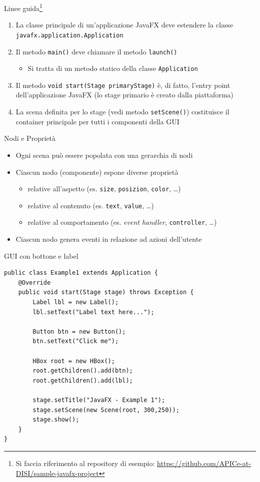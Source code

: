 \documentclass[xcolor=dvipsnames,presentation]{beamer}
\begin{document}
\begin{frame}{Linee guida\footnote{Si faccia riferimento al repository di esempio: 
\url{https://github.com/APICe-at-DISI/sample-javafx-project}
}}

\begin{enumerate}\itemsep15pt

\item La classe principale di un'applicazione JavaFX deve estendere la classe \texttt{javafx.application.Application}
\item Il metodo \texttt{main()} deve chiamare il metodo \texttt{launch()}
\begin{itemize}
\item Si tratta di un metodo statico della classe \texttt{Application}
\end{itemize}
\item Il metodo \texttt{void start(Stage primaryStage)} è, di fatto, l'entry point dell'applicazione JavaFX (lo stage primario è creato dalla piattaforma)
\item La scena definita per lo stage (vedi metodo \texttt{setScene()}) costituisce il container principale per tutti i componenti della GUI
\end{enumerate}
\end{frame}

\begin{frame}{Nodi e Proprietà}
\begin{itemize}\itemsep10pt
\item Ogni scena può essere popolata con una gerarchia di nodi
\item Ciascun nodo (componente) espone diverse proprietà
\begin{itemize}
\item relative all'aspetto (es. \texttt{size}, \texttt{posizion}, \texttt{color}, \dots)
\item relative al contenuto (es. \texttt{text}, \texttt{value}, \dots)
\item relative al comportamento (es. \emph{event handler}, \texttt{controller}, \dots)
\end{itemize}
\item Ciascun nodo genera eventi in relazione ad azioni dell'utente
\end{itemize}
\end{frame}

\begin{frame}[fragile]{GUI con bottone e label}
\begin{lstlisting}
public class Example1 extends Application {
	@Override
	public void start(Stage stage) throws Exception {
		Label lbl = new Label();
		lbl.setText("Label text here...");

		Button btn = new Button();
		btn.setText("Click me");

		HBox root = new HBox();
		root.getChildren().add(btn);
		root.getChildren().add(lbl);

		stage.setTitle("JavaFX - Example 1");
		stage.setScene(new Scene(root, 300,250));
		stage.show();
	}
}
\end{lstlisting}
\end{frame}
\end{document}
